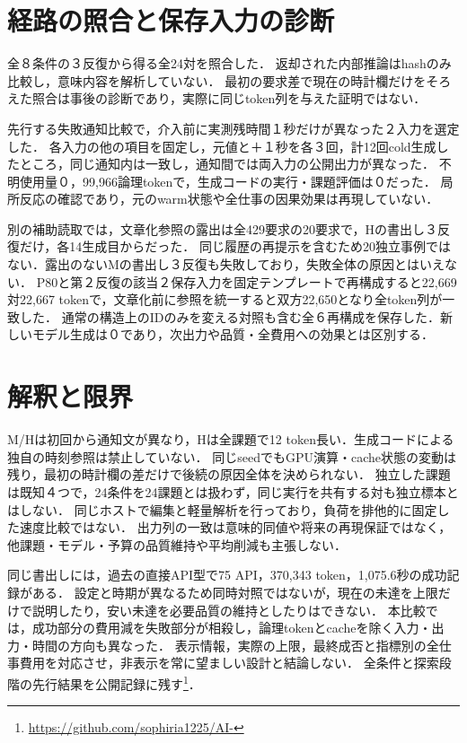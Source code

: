 \documentclass[letter]{ieicej}
\begin{document}
\section{経路の照合と保存入力の診断}
全８条件の３反復から得る全24対を照合した．
返却された内部推論はhashのみ比較し，意味内容を解析していない．
最初の要求差で現在の時計欄だけをそろえた照合は事後の診断であり，実際に同じtoken列を与えた証明ではない．


先行する失敗通知比較で，介入前に実測残時間１秒だけが異なった２入力を選定した．
各入力の他の項目を固定し，元値と＋１秒を各３回，計12回cold生成したところ，同じ通知内は一致し，通知間では両入力の公開出力が異なった．
不明使用量０，99,966論理tokenで，生成コードの実行・課題評価は０だった．
局所反応の確認であり，元のwarm状態や全仕事の因果効果は再現していない．

別の補助読取では，文章化参照の露出は全429要求の20要求で，Hの書出し３反復だけ，各14生成目からだった．
同じ履歴の再提示を含むため20独立事例ではない．露出のないMの書出し３反復も失敗しており，失敗全体の原因とはいえない．
P80と第２反復の該当２保存入力を固定テンプレートで再構成すると22,669対22,667 tokenで，文章化前に参照を統一すると双方22,650となり全token列が一致した．
通常の構造上のIDのみを変える対照も含む全６再構成を保存した．新しいモデル生成は０であり，次出力や品質・全費用への効果とは区別する．

\section{解釈と限界}
M/Hは初回から通知文が異なり，Hは全課題で12 token長い．生成コードによる独自の時刻参照は禁止していない．
同じseedでもGPU演算・cache状態の変動は残り，最初の時計欄の差だけで後続の原因全体を決められない．
独立した課題は既知４つで，24条件を24課題とは扱わず，同じ実行を共有する対も独立標本とはしない．
同じホストで編集と軽量解析を行っており，負荷を排他的に固定した速度比較ではない．
出力列の一致は意味的同値や将来の再現保証ではなく，他課題・モデル・予算の品質維持や平均削減も主張しない．

同じ書出しには，過去の直接API型で75 API，370,343 token，1,075.6秒の成功記録がある．
設定と時期が異なるため同時対照ではないが，現在の未達を上限だけで説明したり，安い未達を必要品質の維持としたりはできない．
本比較では，成功部分の費用減を失敗部分が相殺し，論理tokenとcacheを除く入力・出力・時間の方向も異なった．
表示情報，実際の上限，最終成否と指標別の全仕事費用を対応させ，非表示を常に望ましい設計と結論しない．
全条件と探索段階の先行結果を公開記録に残す\footnote{\url{https://github.com/sophiria1225/AI-}}．
\end{document}
